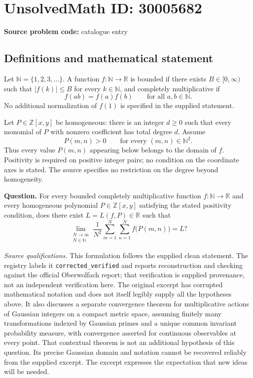 \documentclass[11pt]{article}
\newcommand{\N}{\mathbb{N}}
\newcommand{\Z}{\mathbb{Z}}
\newcommand{\R}{\mathbb{R}}
\begin{document}
\section*{UnsolvedMath ID: 30005682}
\textbf{Source problem code:} catalogue entry
\subsection{Definitions and mathematical statement}
Let \(\N=\{1,2,3,\ldots\}\). A function \(f:\N\to\R\) is bounded if there exists \(B\in[0,\infty)\) such that \(|f(k)|\le B\) for every \(k\in\N\), and completely multiplicative if
\[
f(ab)=f(a)f(b)\qquad\text{for all }a,b\in\N.
\]
No additional normalization of \(f(1)\) is specified in the supplied statement.

Let \(P\in\Z[x,y]\) be homogeneous: there is an integer \(d\ge0\) such that every monomial of \(P\) with nonzero coefficient has total degree \(d\). Assume
\[
P(m,n)>0\qquad\text{for every }(m,n)\in\N^2.
\]
Thus every value \(P(m,n)\) appearing below belongs to the domain of \(f\). Positivity is required on positive integer pairs; no condition on the coordinate axes is stated. The source specifies no restriction on the degree beyond homogeneity.

\textbf{Question.} For every bounded completely multiplicative function \(f:\N\to\R\) and every homogeneous polynomial \(P\in\Z[x,y]\) satisfying the stated positivity condition, does there exist \(L=L(f,P)\in\R\) such that
\[
\lim_{\substack{N\to\infty\\N\in\N}}
\frac{1}{N^2}\sum_{m=1}^{N}\sum_{n=1}^{N}f\bigl(P(m,n)\bigr)=L?
\]

\textit{Source qualifications.} This formulation follows the supplied clean statement. The registry labels it \texttt{corrected\_verified} and reports reconstruction and checking against the official Oberwolfach report; that verification is supplied provenance, not an independent verification here. The original excerpt has corrupted mathematical notation and does not itself legibly supply all the hypotheses above. It also discusses a separate convergence theorem for multiplicative actions of Gaussian integers on a compact metric space, assuming finitely many transformations indexed by Gaussian primes and a unique common invariant probability measure, with convergence asserted for continuous observables at every point. That contextual theorem is not an additional hypothesis of this question. Its precise Gaussian domain and notation cannot be recovered reliably from the supplied excerpt. The excerpt expresses the expectation that new ideas will be needed.
\end{document}
